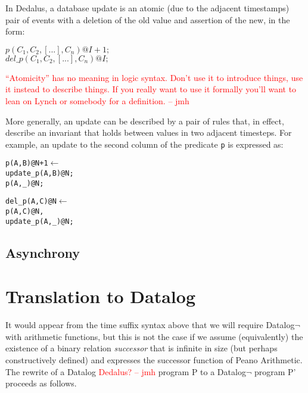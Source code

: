 \documentclass{acm_proc_article-sp-sigmod09}
\newcommand{\jmh}[1]{{\textcolor{red}{#1 -- jmh}}}
\newenvironment{Dedalus}{
\vspace{0.5em}\begin{minipage}{0.95\textwidth}%
\begin{alltt}\fontsize{9pt}{9pt}\selectfont}
{\end{alltt}\end{minipage}\vspace{0.5em}}
\newcommand{\dedalus}[1]{\texttt{\fontsize{9pt}{9pt}\selectfont #1}}
\begin{document}
In Dedalus, a database update is an atomic (due to the adjacent timestamps)
pair of events with a deletion of the old value and assertion of the new, in
the form:

$p(C_{1},C_{2},[...],C_{n})@I+1;$
\\
$del\_p(C_{1},C_{2},[...],C_{n})@I;$

\jmh{``Atomicity'' has no meaning in logic syntax.  Don't use it to introduce things, use it instead to describe things.  If you really want to use it formally you'll want to lean on Lynch or somebody for a definition.}

More generally, an update can be described by a pair of rules that, in effect,
describe an invariant that holds between values in two adjacent timesteps.
For example, an update to the second column of the predicate \dedalus{p} is
expressed as:

\begin{Dedalus}
p(A, B)@N+1 \(\leftarrow\)
  update_p(A, B)@N;
  p(A, _)@N;
  
del_p(A, C)@N \(\leftarrow\)
  p(A, C)@N,
  update_p(A, _)@N;
\end{Dedalus}

\subsection{Asynchrony}



\section{Translation to Datalog}

It would appear from the time suffix syntax above that we will require Datalog$\lnot$ with arithmetic functions, but this is not the case if we assume
(equivalently) the existence of a binary relation \emph{successor} that is infinite in size (but perhaps constructively defined) and expresses the 
successor function of Peano Arithmetic.  The rewrite of a Datalog \jmh{Dedalus?} program P to a Datalog$\lnot$ program P' proceeds as follows.
\end{document}
